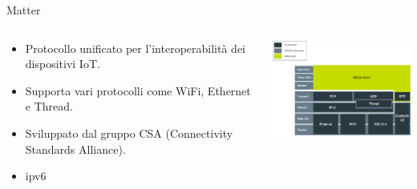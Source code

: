 \documentclass{beamer}
\begin{document}
	\begin{frame}{Matter}
		\begin{columns}
			\begin{column}{0.4\textwidth}
				\begin{itemize}
					\item Protocollo unificato per l'interoperabilità dei dispositivi IoT.
					\item Supporta vari protocolli come WiFi, Ethernet e Thread.
					\item Sviluppato dal gruppo CSA (Connectivity Standards Alliance).
					\item ipv6
				\end{itemize}
			\end{column}
			\begin{column}{0.6\textwidth}
				\includegraphics[width=6cm]{images/matter_stack.png}
			\end{column}
		\end{columns}
	\end{frame}
	
\end{document}
